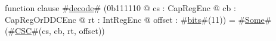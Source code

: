 function clause #\hyperref[zdecode]{decode}# (0b111110 @ cs : CapRegEnc @ cb : CapRegOrDDCEnc @ rt : IntRegEnc @ offset : #\hyperref[zbits]{bits}#(11)) = #\hyperref[zSome]{Some}#(#\hyperref[zCSC]{CSC}#(cs, cb, rt, offset))

